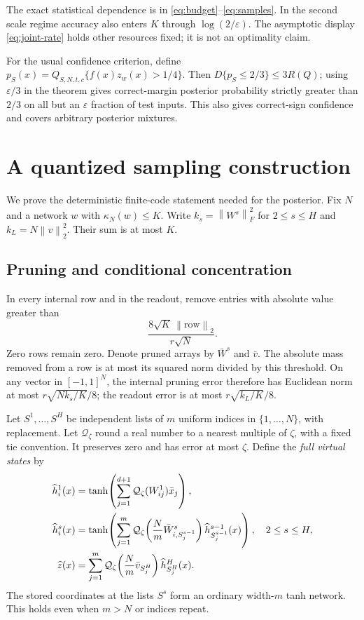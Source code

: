 \documentclass[11pt]{article}
\newcommand{\norm}[1]{\left\|#1\right\|}
\begin{document}
The exact statistical dependence is in \eqref{eq:budget}--\eqref{eq:samples}.
In the second scale regime accuracy also enters $K$ through
$\log(2/\varepsilon)$. The asymptotic display \eqref{eq:joint-rate} holds
other resources fixed; it is not an optimality claim.

For the usual confidence criterion, define
$p_S(x)=Q_{S,N,t,c}\{f(x)z_w(x)>1/4\}$. Then
$D\{p_S\le2/3\}\le3R(Q)$; using $\varepsilon/3$ in the theorem gives
correct-margin posterior probability strictly greater than $2/3$ on all
but an $\varepsilon$ fraction of test inputs. This also gives correct-sign
confidence and covers arbitrary posterior mixtures.

\section{A quantized sampling construction}

We prove the deterministic finite-code statement needed for the posterior.
Fix $N$ and a network $w$ with $\kappa_N(w)\le K$. Write
$k_s=\norm{W^s}_F^2$ for $2\le s\le H$ and
$k_L=N\norm v_2^2$. Their sum is at most $K$.

\subsection{Pruning and conditional concentration}
In every internal row and in the readout, remove entries with absolute
value greater than
\[
 \frac{8\sqrt K\,\norm{\text{row}}_2}{r\sqrt N}.
\]
Zero rows remain zero. Denote pruned arrays by $\bar W^s$ and $\bar v$.
The absolute mass removed from a row is at most its squared norm divided
by this threshold. On any vector in $[-1,1]^N$, the internal pruning error
therefore has Euclidean norm at most
$r\sqrt{Nk_s/K}/8$; the readout error is at most
$r\sqrt{k_L/K}/8$.

Let $S^1,\ldots,S^H$ be independent lists of $m$ uniform indices in
$\{1,\ldots,N\}$, with replacement. Let $\mathcal Q_\zeta$ round a real
number to a nearest multiple of $\zeta$, with a fixed tie convention.
It preserves zero and has error at most $\zeta$. Define the \emph{full
virtual states} by
\begin{align}
 \widehat h^1_i(x)&=\tanh\!\left(
       \sum_{j=1}^{d+1}\mathcal Q_\zeta(W^1_{ij})\bar x_j\right),\notag\\
 \widehat h^s_i(x)&=\tanh\!\left(
       \sum_{j=1}^m
       \mathcal Q_\zeta\!\left(\frac Nm\bar W^s_{i,S^{s-1}_j}\right)
       \widehat h^{s-1}_{S^{s-1}_j}(x)\right),\quad 2\le s\le H,\notag\\
 \widehat z(x)&=\sum_{j=1}^m
       \mathcal Q_\zeta\!\left(\frac Nm\bar v_{S^H_j}\right)
       \widehat h^H_{S^H_j}(x).
 \label{eq:virtual}
\end{align}
The stored coordinates at the lists $S^s$ form an ordinary width-$m$
tanh network. This holds even when $m>N$ or indices repeat.
\end{document}
